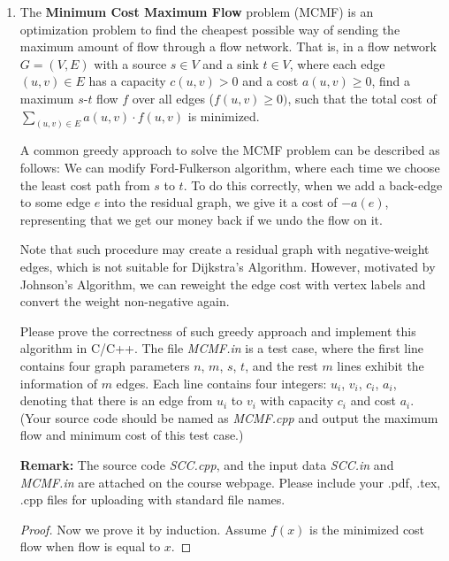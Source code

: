 \documentclass[12pt,a4paper]{article}
\theoremstyle{definition}
\begin{document}
\begin{enumerate}
	\item The \textbf{Minimum Cost Maximum Flow} problem (MCMF) is an optimization problem to find the cheapest possible way of sending the maximum amount of flow through a flow network. That is, in a flow network $G = (V, E)$ with a source $s\in V$ and a sink $t\in V$, where each edge $(u, v)\in E$ has a capacity $c(u,v) > 0$ and a cost $a(u,v) \ge 0$, find a maximum $s\text{-}t$ flow $f$ over all edges ($f(u, v) \ge 0)$, such that the total cost of $\sum_{(u, v) \in E} a(u, v) \cdot f(u, v)$ is minimized.

A common greedy approach to solve the MCMF problem can be described as follows: We can modify Ford-Fulkerson algorithm, where each time we choose the least cost path from $s$ to $t$. To do this correctly, when we add a back-edge to some edge $e$ into the residual graph, we give it a cost of $-a(e)$, representing that we get our money back if we undo the flow on it.

Note that such procedure may create a residual graph with negative-weight edges, which is not suitable for Dijkstra's Algorithm. However, motivated by Johnson's Algorithm, we can reweight the edge cost with vertex labels and convert the weight non-negative again.

Please prove the correctness of such greedy approach and implement this algorithm in C/C++. The file \emph{MCMF.in} is a test case, where the first line contains four graph parameters $n$, $m$, $s$, $t$, and the rest $m$ lines exhibit the information of $m$ edges. Each line contains four integers: $u_i$, $v_i$, $c_i$, $a_i$, denoting that there is an edge from $u_i$ to $v_i$ with capacity $c_i$ and cost $a_i$. {\color{blue}(Your source code should be named as \emph{MCMF.cpp} and output the maximum flow and minimum cost of this test case.)}

\hspace{1cm}
\begin{minipage}[t]{0.45\textwidth}
\textbf{Remark:} The source code \emph{SCC.cpp}, and the input data \emph{SCC.in} and \emph{MCMF.in} are attached on the course webpage. Please include your .pdf, .tex, .cpp files for uploading with standard file names.
\end{minipage}
    \begin{proof}
        Now we prove it by induction. Assume $f(x)$ is the minimized cost flow when flow is equal to $x$.


\end{proof}
\end{enumerate}
\end{document}
